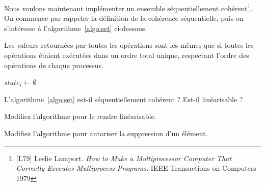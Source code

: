\begin{exercice}
  Nous voulons maintenant implémenter un ensemble séquentiellement cohérent\footnote{[L79] Leslie Lamport. \emph{How to Make a Multiprocessor
  Computer That Correctly Executes Multiprocess Programs.} IEEE Transactions on Computers 1979}. On commence par rappeler la définition de la cohérence séquentielle,
  puis on s'intéresse à l'algorithme~\ref{algo:set} ci-dessous.

  \begin{definition}
    Les valeurs retournées par toutes les opérations sont les mêmes que si toutes les opérations étaient exécutées dans un ordre total unique,
    respectant l'ordre des opérations de chaque processus.
  \end{definition}
  

  \begin{algorithm}
    $\mathit{state}_i \leftarrow \emptyset$\;
    \caption{Grow-Only-Set (code pour $p_i$)}
    \label{algo:set}
  \end{algorithm}


  \begin{questions}
  \item L'algorithme~\ref{algo:set} est-il séquentiellement cohérent ? Est-il linéarisable ? 
  \item Modifiez l'algorithme pour le rendre linéarisable. 
  \item Modifiez l'algorithme pour autoriser la suppression d'un élément. 
  \end{questions}
  
\end{exercice}

\endgroup
\endinput
